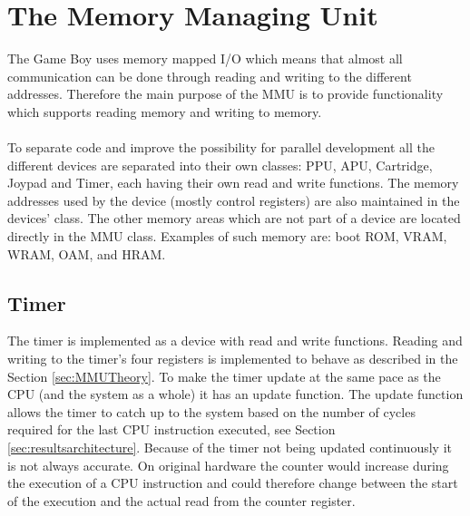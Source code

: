 \newpage
\section{The Memory Managing Unit}
The Game Boy uses memory mapped I/O which means that almost all communication can be done through reading and writing to the different addresses. Therefore the main purpose of the MMU is to provide functionality which supports reading memory and writing to memory. 
\\\\
To separate code and improve the possibility for parallel development all the different devices are separated into their own classes: PPU, APU, Cartridge, Joypad and Timer, each having their own read and write functions. 
The memory addresses used by the device (mostly control registers) are also maintained in the devices' class. 
The other memory areas which are not part of a device are located directly in the MMU class. Examples of such memory are: boot ROM, VRAM, WRAM, OAM, and HRAM.

\subsection{Timer}

The timer is implemented as a device with read and write functions. 
Reading and writing to the timer's four registers is implemented to behave as described in the Section \ref{sec:MMUTheory}.  
To make the timer update at the same pace as the CPU (and the system as a whole) it has an update function. 
The update function allows the timer to catch up to the system based on the number of cycles required for the last CPU instruction executed, see Section \ref{sec:resultsarchitecture}.
Because of the timer not being updated continuously it is not always accurate. On original hardware the counter would increase during the execution of a CPU instruction and could therefore change between the start of the execution and the actual read from the counter register.


